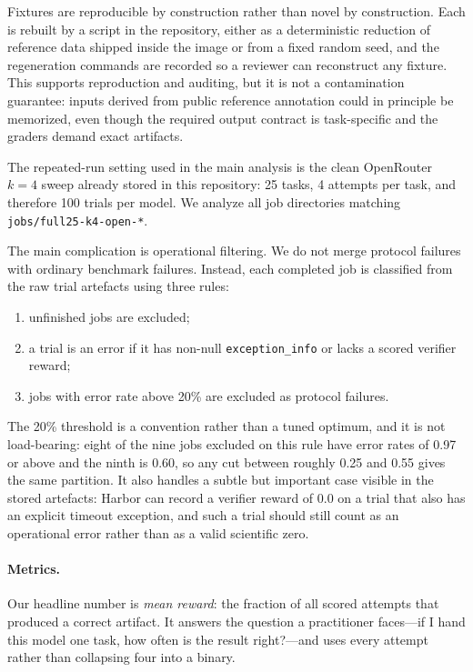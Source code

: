 \documentclass[11pt]{article}
\begin{document}
Fixtures are reproducible by construction rather than novel by construction.
Each is rebuilt by a script in the repository, either as a deterministic reduction of reference data shipped inside the image or from a fixed random seed, and the regeneration commands are recorded so a reviewer can reconstruct any fixture.
This supports reproduction and auditing, but it is not a contamination guarantee: inputs derived from public reference annotation could in principle be memorized, even though the required output contract is task-specific and the graders demand exact artifacts.

The repeated-run setting used in the main analysis is the clean OpenRouter $k=4$ sweep already stored in this repository: 25 tasks, 4 attempts per task, and therefore 100 trials per model.
We analyze all job directories matching \texttt{jobs/full25-k4-open-*}.

The main complication is operational filtering.
We do not merge protocol failures with ordinary benchmark failures.
Instead, each completed job is classified from the raw trial artefacts using three rules:

\begin{enumerate}[leftmargin=1.5em]
\item unfinished jobs are excluded;
\item a trial is an error if it has non-null \texttt{exception\_info} or lacks a scored verifier reward;
\item jobs with error rate above 20\% are excluded as protocol failures.
\end{enumerate}

The 20\% threshold is a convention rather than a tuned optimum, and it is not load-bearing: eight of the nine jobs excluded on this rule have error rates of 0.97 or above and the ninth is 0.60, so any cut between roughly 0.25 and 0.55 gives the same partition.
It also handles a subtle but important case visible in the stored artefacts: Harbor can record a verifier reward of 0.0 on a trial that also has an explicit timeout exception, and such a trial should still count as an operational error rather than as a valid scientific zero.

\paragraph{Metrics.}
Our headline number is \emph{mean reward}: the fraction of all scored attempts that produced a correct artifact.
It answers the question a practitioner faces---if I hand this model one task, how often is the result right?---and uses every attempt rather than collapsing four into a binary.
\end{document}
